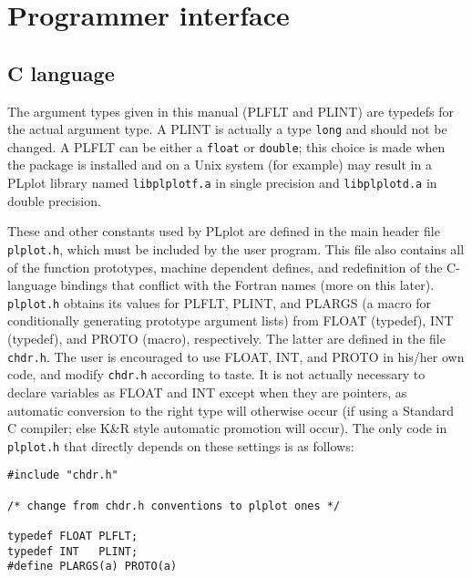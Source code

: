 \chapter{Programmer interface}
\label{ap:lang}

\section {C language}

The argument types given in this manual (PLFLT and PLINT) are typedefs for
the actual argument type.  A PLINT is actually a type {\tt long} and should
not be changed.  A PLFLT can be either a {\tt float} or {\tt double}; this
choice is made when the package is installed and on a Unix system (for
example) may result in a PLplot library named {\tt libplplotf.a} in single
precision and {\tt libplplotd.a} in double precision.

These and other constants used by PLplot are defined in the main header file
{\tt plplot.h}, which must be included by the user program.  This file also
contains all of the function prototypes, machine dependent defines, and
redefinition of the C-language bindings that conflict with the Fortran names
(more on this later).  {\tt plplot.h} obtains its values for PLFLT, PLINT,
and PLARGS (a macro for conditionally generating prototype argument lists)
from FLOAT (typedef), INT (typedef), and PROTO (macro), respectively.
The latter are defined in the file
{\tt chdr.h}.  The user is encouraged to use FLOAT, INT, and PROTO in
his/her own code, and modify {\tt chdr.h} according to taste.  It is not
actually necessary to declare variables as FLOAT and INT except when they
are pointers, as automatic conversion to the right type will otherwise occur
(if using a Standard C compiler; else K\&R style automatic promotion will
occur).  The only code in {\tt plplot.h} that directly depends on these
settings is as follows:
\begin{verbatim}
#include "chdr.h"

/* change from chdr.h conventions to plplot ones */

typedef FLOAT PLFLT;
typedef INT   PLINT;
#define PLARGS(a) PROTO(a)
\end{verbatim}

